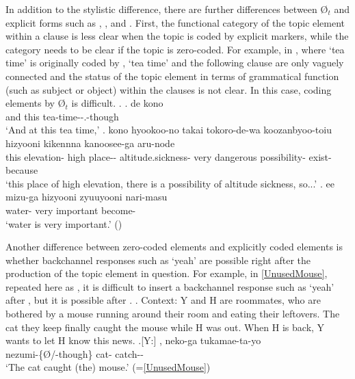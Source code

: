 In addition to the stylistic difference,
there are further differences between {\O$_{t}$} and explicit forms such as , , and .
First,
the functional category of the topic element within a clause is less clear when the topic is coded by explicit markers,
while the category needs to be clear
if the topic is zero-coded.
For example, in \Next,
where  `tea time' is originally coded by ,
`tea time' and the following clause are only vaguely connected
and the status of the topic element in terms of grammatical function (such as subject or object) within the clauses is not clear.
In this case, coding elements by {\O$_{t}$} is difficult.
%
\ex. \ag. de kono  \\
		and this tea-time--.-though \\
		`And at this tea time,'
	\bg. kono hyookoo-no {takai} {tokoro-de-wa} koozanbyoo-toiu hizyooni {kikennna} {kanoosee-ga} aru-node \\
		this elevation- high place-- altitude.sickness- very dangerous possibility- exist-because \\
		`this place of high elevation, there is a possibility of altitude sickness, so...'
	\bg. ee {mizu-ga} hizyooni zyuuyooni nari-masu \\
		 water- very important become- \\
		`water is very important.'
		 \hfill{()}



Another difference between zero-coded elements and explicitly coded elements is whether backchannel responses such as  `yeah' are possible right after the production of the topic element in question.
For example, in \ref{UnusedMouse}, repeated here as \Next,
it is difficult to insert a backchannel response such as  `yeah' after ,
but it is possible after .
%
\ex. Context: Y and H are roommates,
	who are bothered by a mouse running around their room
	and eating their leftovers.
	The cat they keep finally caught the mouse while H was out.
	When H is back, Y wants to let H know this news.
	\ag.[Y:] , neko-ga tukamae-ta-yo \\
		nezumi-\{{\O}/-though\} cat- catch-- \\
		`The cat caught (the) mouse.' \hfill{(=\ref{UnusedMouse})}

